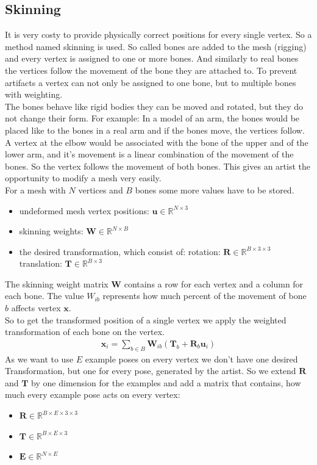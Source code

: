 \documentclass[
	11pt, 
	DIV10,
	a4paper, 
	oneside, 
	headings=normal, 
	captions=tableheading,
	final, 
	numbers=noenddot
]{scrartcl}
\begin{document}
\subsection{Skinning}
It is very costy to provide physically correct positions for every single vertex. So a method named skinning is used. So called bones are added to the mesh (rigging) and every vertex is assigned to one or more bones. And similarly to real bones the vertices follow the movement of the bone they are attached to. To prevent artifacts a vertex can not only be assigned to one bone, but to multiple bones with weighting. \\
The bones behave like rigid bodies they can be moved and rotated, but they do not change their form. For example: In a model of an arm, the bones would be placed like to the bones in a real arm and if the bones move, the vertices follow. A vertex at the elbow would be associated with the bone of the upper and of the lower arm, and it's movement is a linear combination of the movement of the bones. So the vertex follows the movement of both bones. This gives an artist the opportunity to modify a mesh very easily. \\
For a mesh with $N$ vertices and $B$ bones some more values have to be stored.
\begin{itemize}
	\item undeformed mesh vertex positions: $\bm{u} \in \mathbb{R}^{N \times 3}$	
	\item skinning weights: $\bm{W} \in \mathbb{R} ^{N \times B}$
	\item the desired transformation, which consist of:
	\subitem rotation: $\bm{R} \in \mathbb{R}^{B\times 3\times 3}$
	\subitem translation: $\bm{T}\in \mathbb{R}^{B\times 3}$
\end{itemize}
The skinning weight matrix $\bm{W}$ contains a row for each vertex and a column for each bone. The value $W_{ib}$ represents how much percent of the movement of bone $b$ affects vertex $\bm x$.\\
So to get the transformed position of a single vertex we apply the weighted transformation of each bone on the vertex.
\begin{align}
\bm{x}_i =\sum_{b\in B} \bm{W}_{ib}\left(\bm{T}_b +\bm{R}_b \bm{u}_i\right)
\end{align}
As we want to use $E$ example poses on every vertex we don't have one desired Transformation, but one for every pose, generated by the artist. So we extend $\bm{R}$ and $\bm{T}$ by one dimension for the examples and add a matrix that contains, how much every example pose acts on every vertex:
\begin{itemize}
	\item $\bm {R}\in\mathbb{R}^{B\times E\times 3\times 3}$
	\item $\bm {T}\in \mathbb{R}^{B\times E\times 3}$
	\item $\bm{E}\in \mathbb{R}^{N \times E}$
\end{itemize}
\end{document}
